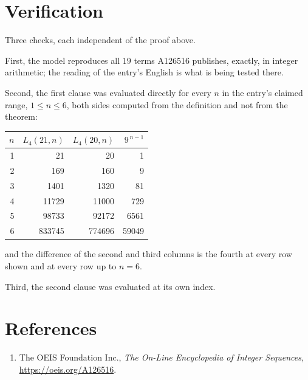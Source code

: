 \documentclass[11pt,a4paper]{article}
\theoremstyle{plain}
\theoremstyle{definition}
\begin{document}
\section{Verification}

Three checks, each independent of the proof above.

First, the model reproduces all $19$ terms A126516 publishes, exactly, in integer
arithmetic; the reading of the entry's English is what is being tested there.

Second, the first clause was evaluated directly for every $n$ in the entry's claimed range,
$1\le n\le6$, both sides computed from the definition and not from the theorem:

\begin{center}
\begin{tabular}{rrrr}
$n$ & $L_{4}(21,n)$ & $L_{4}(20,n)$ & $9^{\,n-1}$ \\ \hline
1 & 21 & 20 & 1 \\
2 & 169 & 160 & 9 \\
3 & 1401 & 1320 & 81 \\
4 & 11729 & 11000 & 729 \\
5 & 98733 & 92172 & 6561 \\
6 & 833745 & 774696 & 59049 \\
\end{tabular}
\end{center}

\noindent and the difference of the second and third columns is the fourth at every row shown
and at every row up to $n=6$.

Third, the second clause was evaluated at its own index.

\section*{References}
\begin{enumerate}
\item The OEIS Foundation Inc., \emph{The On-Line Encyclopedia of Integer Sequences},
\url{https://oeis.org/A126516}.
\end{enumerate}
\end{document}
